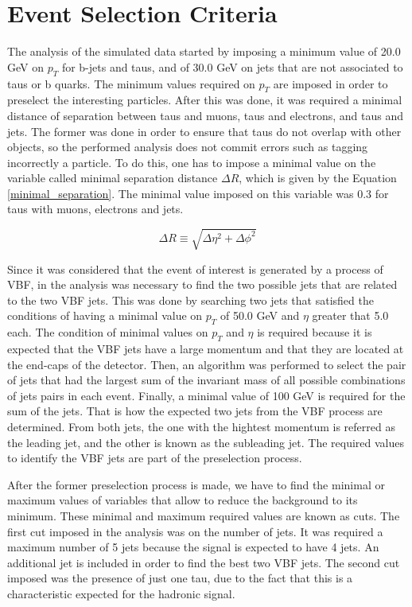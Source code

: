 \chapter{Event Selection Criteria}
\label{Event_selection_criteria_chapter}

The analysis of the simulated data started by imposing a minimum value of 20.0 GeV on $p_T$ for b-jets and taus, and of 30.0 GeV on jets that are not associated to taus or b quarks. The minimum values 
required on $p_T$ are imposed in order to preselect the interesting particles. After this was done, it was required a minimal distance of separation between taus and muons, taus and electrons, 
and taus and jets. The former was done in order to ensure that taus do not overlap with other objects, so the performed analysis does not commit errors such as tagging incorrectly a particle.
To do this, one has to impose a minimal value on the variable called minimal separation distance $\Delta R$, which is given by the Equation \ref{minimal_separation}. The minimal value imposed on this 
variable was 0.3 for taus with muons, electrons and jets. 

\begin{equation}
\Delta R \equiv \sqrt{\Delta \eta ^2 + \Delta \phi ^2}
\label{minimal_separation}
\end{equation}

Since it was considered that the event of interest is generated by a process of VBF, in the analysis was necessary to find the two possible jets that are related to the two VBF jets. This was done by 
searching two jets that satisfied the conditions of having a minimal value on $p_T$ of 50.0 GeV and $\eta$ greater that 5.0 each. The condition of minimal values on $p_T$ and $\eta$ is required 
because it is expected that the VBF jets have a large momentum and that they are located at the end-caps of the detector. Then, an algorithm was performed to select the pair of jets that had the 
largest sum of the invariant mass of all possible combinations of jets pairs in each event. Finally, a minimal value of 100 GeV is required for the sum of the jets. That is how the expected two jets from the VBF 
process are determined. From both jets, the one with the hightest momentum is referred as the leading jet, and the other is known as the subleading jet. The required values to identify the VBF 
jets are part of the preselection process.

After the former preselection process is made, we have to find the minimal or maximum values of variables that allow to reduce the background to its minimum. These minimal and maximum
required values are known as cuts. The first cut imposed in the analysis was on the number of jets. It was required a maximum number of 5 jets because the signal is expected to have 4 jets. An
additional jet is included in order to find the best two VBF jets. The second cut imposed was the presence of just one tau, due to the fact that this is a characteristic expected for the hadronic 
signal. 

